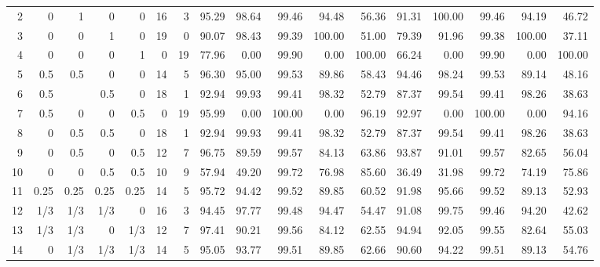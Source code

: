 \begin{landscape}
\begin{table}[p]
{\begin{tabular}{rrrrrrrrrrrrrrrrr}
2 & 0 & 1 & 0 & 0 & \multicolumn{1}{|r}{16} & 3 & \multicolumn{1}{|r}{95.29} & 98.64 & 99.46 & 94.48 & 56.36 & \multicolumn{1}{|r}{91.31} & 100.00 & 99.46 & 94.19 & 46.72 \\
3 & 0 & 0 & 1 & 0 & \multicolumn{1}{|r}{19} & 0 & \multicolumn{1}{|r}{90.07} & 98.43 & 99.39 & 100.00 & 51.00 & \multicolumn{1}{|r}{79.39} & 91.96 & 99.38 & 100.00 & 37.11 \\
4 & 0 & 0 & 0 & 1 & \multicolumn{1}{|r}{0} & 19 & \multicolumn{1}{|r}{77.96} & 0.00 & 99.90 & 0.00 & 100.00 & \multicolumn{1}{|r}{66.24} & 0.00 & 99.90 & 0.00 & 100.00 \\
5 & 0.5 & 0.5 & 0 & 0 & \multicolumn{1}{|r}{14} & 5 & \multicolumn{1}{|r}{96.30} & 95.00 & 99.53 & 89.86 & 58.43 & \multicolumn{1}{|r}{94.46} & 98.24 & 99.53 & 89.14 & 48.16 \\
6 & 0.5 &  & 0.5 & 0 & \multicolumn{1}{|r}{18} & 1 & \multicolumn{1}{|r}{92.94} & 99.93 & 99.41 & 98.32 & 52.79 & \multicolumn{1}{|r}{87.37} & 99.54 & 99.41 & 98.26 & 38.63 \\
7 & 0.5 & 0 & 0 & 0.5 & \multicolumn{1}{|r}{0} & 19 & \multicolumn{1}{|r}{95.99} & 0.00 & 100.00 & 0.00 & 96.19 & \multicolumn{1}{|r}{92.97} & 0.00 & 100.00 & 0.00 & 94.16\\
8 & 0 & 0.5 & 0.5 & 0 & \multicolumn{1}{|r}{18} & 1 & \multicolumn{1}{|r}{92.94} & 99.93 & 99.41 & 98.32 & 52.79 & \multicolumn{1}{|r}{87.37} & 99.54 & 99.41 & 98.26 & 38.63 \\
9 & 0 & 0.5 & 0 & 0.5 & \multicolumn{1}{|r}{12} & 7 & \multicolumn{1}{|r}{96.75} & 89.59 & 99.57 & 84.13 & 63.86 & \multicolumn{1}{|r}{93.87} & 91.01 & 99.57 & 82.65 & 56.04 \\
10 & 0 & 0 & 0.5 & 0.5 & \multicolumn{1}{|r}{10} & 9 & \multicolumn{1}{|r}{57.94} & 49.20 & 99.72 & 76.98 & 85.60 & \multicolumn{1}{|r}{36.49} & 31.98 & 99.72 & 74.19 & 75.86 \\
11 & 0.25 & 0.25 & 0.25 & 0.25 & \multicolumn{1}{|r}{14} & 5 & \multicolumn{1}{|r}{95.72} & 94.42 & 99.52 & 89.85 & 60.52 & \multicolumn{1}{|r}{91.98} & 95.66 & 99.52 & 89.13 & 52.93 \\
12 & 1/3 & 1/3 & 1/3 & 0 & \multicolumn{1}{|r}{16} & 3 & \multicolumn{1}{|r}{94.45} & 97.77 & 99.48 & 94.47 & 54.47 & \multicolumn{1}{|r}{91.08} & 99.75 & 99.46 & 94.20 & 42.62 \\
13 & 1/3 & 1/3 & 0 & 1/3 & \multicolumn{1}{|r}{12} & 7 & \multicolumn{1}{|r}{97.41} & 90.21 & 99.56 & 84.12 & 62.55 & \multicolumn{1}{|r}{94.94} & 92.05 & 99.55 & 82.64 & 55.03 \\
14 & 0 & 1/3 & 1/3 & 1/3 & \multicolumn{1}{|r}{14} & 5 & \multicolumn{1}{|r}{95.05} & 93.77 & 99.51 & 89.85 & 62.66 & \multicolumn{1}{|r}{90.60} & 94.22 & 99.51 & 89.13 & 54.76
\end{tabular}
}
\end{table}
\end{landscape}
